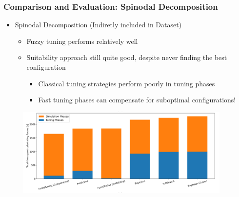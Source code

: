 \documentclass[
	10pt,
	t		%
]{beamer}
\begin{document}
\begin{frame}
	\frametitle{Comparison and Evaluation: Spinodal Decomposition}

	\begin{itemize}
		\item Spinodal Decomposition (Indiretly included in Dataset)
		      \begin{itemize}
			      \item Fuzzy tuning performs relatively well
			      \item Suitability approach still quite good, despite never finding the best configuration
			            \begin{itemize}
				            \item Classical tuning strategies perform poorly in tuning phases
				            \item Fast tuning phases can compensate for suboptimal configurations!
			            \end{itemize}
		      \end{itemize}
	\end{itemize}

	\begin{figure}
		\centering
		\includegraphics[width=0.95\textwidth]{figures/spinodal-total.png}
	\end{figure}
\end{frame}
\end{document}

